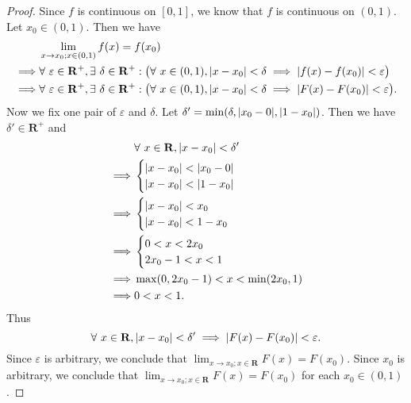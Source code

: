 \begin{proof}
    Since \(f\) is continuous on \([0, 1]\), we know that \(f\) is continuous on \((0, 1)\).
    Let \(x_0 \in (0, 1)\).
    Then we have
    \begin{align*}
                 & \lim_{x \to x_0 ; x \in (0, 1)} f(x) = f(x_0)                                                                                                                                   \\
        \implies & \forall\ \varepsilon \in \mathbf{R}^+, \exists\ \delta \in \mathbf{R}^+ : \big(\forall\ x \in (0, 1), \abs*{x - x_0} < \delta \implies \abs*{f(x) - f(x_0)} < \varepsilon\big)  \\
        \implies & \forall\ \varepsilon \in \mathbf{R}^+, \exists\ \delta \in \mathbf{R}^+ : \big(\forall\ x \in (0, 1), \abs*{x - x_0} < \delta \implies \abs*{F(x) - F(x_0)} < \varepsilon\big).
    \end{align*}
    Now we fix one pair of \(\varepsilon\) and \(\delta\).
    Let \(\delta' = \min(\delta, \abs*{x_0 - 0}, \abs*{1 - x_0})\).
    Then we have \(\delta' \in \mathbf{R}^+\) and
    \begin{align*}
                 & \forall\ x \in \mathbf{R}, \abs*{x - x_0} < \delta' \\
        \implies & \begin{cases}
            \abs*{x - x_0} < \abs*{x_0 - 0} \\
            \abs*{x - x_0} < \abs*{1 - x_0}
        \end{cases}                          \\
        \implies & \begin{cases}
            \abs*{x - x_0} < x_0 \\
            \abs*{x - x_0} < 1 - x_0
        \end{cases}                          \\
        \implies & \begin{cases}
            0 < x < 2x_0 \\
            2x_0 - 1 < x < 1
        \end{cases}                          \\
        \implies & \max(0, 2x_0 - 1) < x < \min(2x_0, 1)               \\
        \implies & 0 < x < 1.
    \end{align*}
    Thus
    \[
        \forall\ x \in \mathbf{R}, \abs*{x - x_0} < \delta' \implies \abs*{F(x) - F(x_0)} < \varepsilon.
    \]
    Since \(\varepsilon\) is arbitrary, we conclude that \(\lim_{x \to x_0 ; x \in \mathbf{R}} F(x) = F(x_0)\).
    Since \(x_0\) is arbitrary, we conclude that \(\lim_{x \to x_0 ; x \in \mathbf{R}} F(x) = F(x_0)\) for each \(x_0 \in (0, 1)\).


\end{proof}
